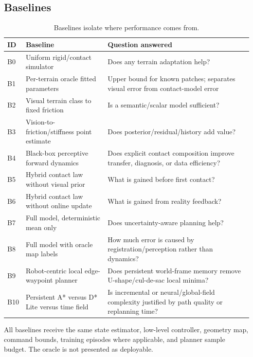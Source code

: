 \subsection{Baselines}

\begin{table}[ht]
\centering
\caption{Baselines isolate where performance comes from.}
\label{tab:baselines}
\small
\begin{tabularx}{\textwidth}{@{}C{8mm}L{38mm}Y@{}}
\toprule
\textbf{ID} & \textbf{Baseline} & \textbf{Question answered}\\
\midrule
B0 & Uniform rigid/contact simulator & Does any terrain adaptation help?\\
B1 & Per-terrain oracle fitted parameters & Upper bound for known patches; separates visual error from contact-model error\\
B2 & Visual terrain class to fixed friction & Is a semantic/scalar model sufficient?\\
B3 & Vision-to-friction/stiffness point estimate \citep{chen2024terrain} & Does posterior/residual/history add value?\\
B4 & Black-box perceptive forward dynamics \citep{roth2025perceptive} & Does explicit contact composition improve transfer, diagnosis, or data efficiency?\\
B5 & Hybrid contact law without visual prior & What is gained before first contact?\\
B6 & Hybrid contact law without online update & What is gained from reality feedback?\\
B7 & Full model, deterministic mean only & Does uncertainty-aware planning help?\\
B8 & Full model with oracle map labels & How much error is caused by registration/perception rather than dynamics?\\
B9 & Robot-centric local edge-waypoint planner & Does persistent world-frame memory remove U-shape/cul-de-sac local minima?\\
B10 & Persistent A* versus D* Lite versus time field & Is incremental or neural/global-field complexity justified by path quality or replanning time?\\
\bottomrule
\end{tabularx}
\end{table}

All baselines receive the same state estimator, low-level controller, geometry map, command bounds, training episodes where applicable, and planner sample budget. The oracle is not presented as deployable.

